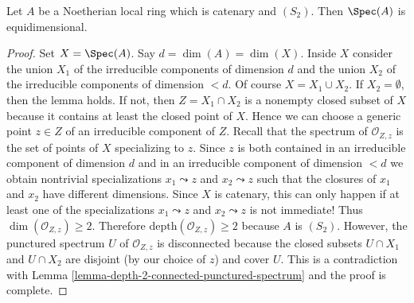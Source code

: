 \begin{lemma}
\label{lemma-catenary-S2-equidimensional}
\begin{reference}
\cite[IV Corollary 5.10.9]{EGA}
\end{reference}
Let $A$ be a Noetherian local ring which is catenary and $(S_2)$.
Then $\Spec(A)$ is equidimensional.
\end{lemma}

\begin{proof}
Set $X = \Spec(A)$. Say $d = \dim(A) = \dim(X)$. Inside $X$ consider the
union $X_1$ of the irreducible components of dimension $d$ and the union
$X_2$ of the irreducible components of dimension $< d$. Of course
$X = X_1 \cup X_2$. If $X_2 = \emptyset$,
then the lemma holds. If not, then $Z = X_1 \cap X_2$ is a nonempty closed
subset of $X$ because it contains at least the closed point of $X$.
Hence we can choose a generic point $z \in Z$ of an irreducible component
of $Z$. Recall that the spectrum of $\mathcal{O}_{Z, z}$ is the set of points
of $X$ specializing to $z$. Since $z$ is both contained in an
irreducible component of dimension $d$ and in an irreducible component
of dimension $< d$ we obtain nontrivial specializations $x_1 \leadsto z$ and
$x_2 \leadsto z$ such that the closures of $x_1$ and $x_2$ have different
dimensions. Since $X$ is catenary, this can only happen if at least
one of the specializations $x_1 \leadsto z$ and $x_2 \leadsto z$ is not
immediate! Thus $\dim(\mathcal{O}_{Z, z}) \geq 2$. Therefore
$\text{depth}(\mathcal{O}_{Z, z}) \geq 2$ because $A$ is $(S_2)$.
However, the punctured spectrum $U$ of $\mathcal{O}_{Z, z}$ is disconnected
because the closed subsets $U \cap X_1$ and $U \cap X_2$ are disjoint
(by our choice of $z$) and cover $U$. This is a contradiction with
Lemma \ref{lemma-depth-2-connected-punctured-spectrum}
and the proof is complete.
\end{proof}